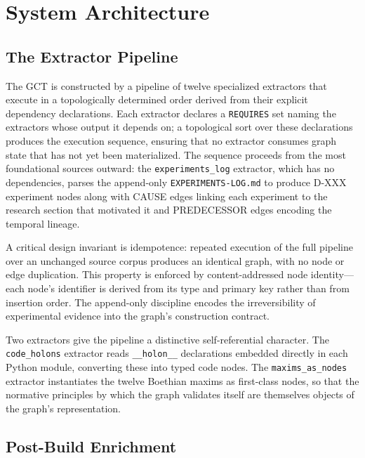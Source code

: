 \documentclass{iosart2x}
\begin{document}
\section{System Architecture}
\label{sec:architecture}

\subsection{The Extractor Pipeline}

The GCT is constructed by a pipeline of twelve specialized extractors that execute in a topologically determined order derived from their explicit dependency declarations. Each extractor declares a \texttt{REQUIRES} set naming the extractors whose output it depends on; a topological sort over these declarations produces the execution sequence, ensuring that no extractor consumes graph state that has not yet been materialized. The sequence proceeds from the most foundational sources outward: the \texttt{experiments\_log} extractor, which has no dependencies, parses the append-only \texttt{EXPERIMENTS-LOG.md} to produce D-XXX experiment nodes along with CAUSE edges linking each experiment to the research section that motivated it and PREDECESSOR edges encoding the temporal lineage.

A critical design invariant is idempotence: repeated execution of the full pipeline over an unchanged source corpus produces an identical graph, with no node or edge duplication. This property is enforced by content-addressed node identity---each node's identifier is derived from its type and primary key rather than from insertion order. The append-only discipline encodes the irreversibility of experimental evidence into the graph's construction contract.

Two extractors give the pipeline a distinctive self-referential character. The \texttt{code\_holons} extractor reads \texttt{\_\_holon\_\_} declarations embedded directly in each Python module, converting these into typed code nodes. The \texttt{maxims\_as\_nodes} extractor instantiates the twelve Boethian maxims as first-class nodes, so that the normative principles by which the graph validates itself are themselves objects of the graph's representation.

\subsection{Post-Build Enrichment}
\end{document}
